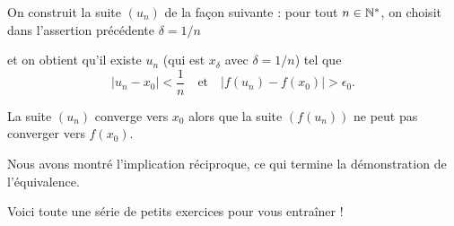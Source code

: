 \change

On construit la suite $(u_n)$ de la façon suivante : pour tout $n\in \mathbb{N}^*$, 
on choisit dans l'assertion précédente $\delta=1/n$ 

\change

et on obtient qu'il existe $u_n$ (qui est $x_\delta$ avec $\delta = 1/n$) tel que 
\[
|u_n-x_0|<\frac1n \quad \text{et} \quad |f(u_n)-f(x_0)|>\epsilon_0.
\]

\change

La suite $(u_n)$ converge vers $x_0$ alors que la suite $(f(u_n))$ ne peut pas converger vers $f(x_0)$.

Nous avons montré l'implication réciproque,
ce qui termine la démonstration de l'équivalence.



\diapo

Voici toute une série de petits exercices pour vous entraîner !



